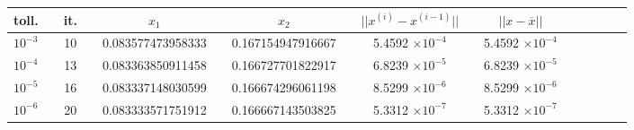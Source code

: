 \noindent\begin{tabular}{l*{15}{c}}
 toll. & \vline& it. & \vline& \(x_1\) &\vline& \(x_2\) & \vline& \(||x^{(i)} - x^{(i-1)}||\) & \vline& \(||x - \overline{x}||\) \\
\hline
 \(10^{-3}\) & \vline& 10 & \vline& \scriptsize{0.083577473958333}& \vline& \scriptsize{0.167154947916667} &\vline& 5.4592 \(\times 10^{-4}\) & \vline& 5.4592 \(\times 10^{-4}\) \\
 \(10^{-4}\) & \vline& 13 & \vline& \scriptsize{0.083363850911458}& \vline& \scriptsize{0.166727701822917} &\vline& 6.8239 \(\times 10^{-5}\) & \vline& 6.8239 \(\times 10^{-5}\) \\
 \(10^{-5}\) & \vline& 16 & \vline& \scriptsize{0.083337148030599}& \vline& \scriptsize{0.166674296061198} &\vline& 8.5299 \(\times 10^{-6}\) & \vline& 8.5299 \(\times 10^{-6}\) \\
 \(10^{-6}\) & \vline& 20 & \vline& \scriptsize{0.083333571751912}& \vline& \scriptsize{0.166667143503825} &\vline& 5.3312 \(\times 10^{-7}\) & \vline& 5.3312 \(\times 10^{-7}\) \\
\end{tabular} \\
